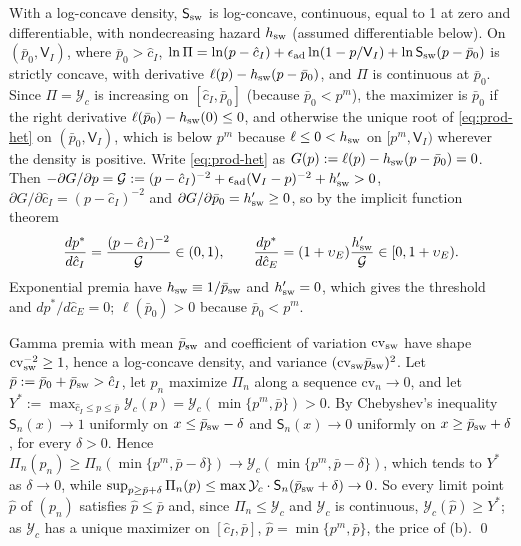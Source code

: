 With a log-concave density, $\mathsf S_{\rm sw}$ is log-concave, continuous, equal to 1 at zero and differentiable, with nondecreasing hazard $h_{\rm sw}$ (assumed differentiable below). On $(\bar p_0,\mathsf V_I)$, where $\bar p_0>\hat c_I$, $\ln\Pi=\ln(p-\hat c_I)+\epsilon_{\rm ad}\ln(1-p/\mathsf V_I)+\ln\mathsf S_{\rm sw}(p-\bar p_0)$ is strictly concave, with derivative $\ell(p)-h_{\rm sw}(p-\bar p_0)$, and $\Pi$ is continuous at $\bar p_0$. Since $\Pi=\mathcal Y_c$ is increasing on $[\hat c_I,\bar p_0]$ (because $\bar p_0<p^m$), the maximizer is $\bar p_0$ if the right derivative $\ell(\bar p_0)-h_{\rm sw}(0)\le 0$, and otherwise the unique root of \eqref{eq:prod-het} on $(\bar p_0,\mathsf V_I)$, which is below $p^m$ because $\ell\le 0<h_{\rm sw}$ on $[p^m,\mathsf V_I)$ wherever the density is positive. Write \eqref{eq:prod-het} as $G(p):=\ell(p)-h_{\rm sw}(p-\bar p_0)=0$. Then $-\partial G/\partial p=\mathcal G:=(p-\hat c_I)^{-2}+\epsilon_{\rm ad}(\mathsf V_I-p)^{-2}+h'_{\rm sw}>0$, $\partial G/\partial\hat c_I=(p-\hat c_I)^{-2}$ and $\partial G/\partial\bar p_0=h'_{\rm sw}\ge 0$, so by the implicit function theorem
\[
\frac{dp^*}{d\hat c_I}=\frac{(p-\hat c_I)^{-2}}{\mathcal G}\in(0,1),\qquad
\frac{dp^*}{d\hat c_E}=(1+\upsilon_E)\frac{h'_{\rm sw}}{\mathcal G}\in[0,1+\upsilon_E).
\]
Exponential premia have $h_{\rm sw}\equiv 1/\bar p_{\rm sw}$ and $h'_{\rm sw}=0$, which gives the threshold and $dp^*/d\hat c_E=0$; $\ell(\bar p_0)>0$ because $\bar p_0<p^m$.

Gamma premia with mean $\bar p_{\rm sw}$ and coefficient of variation $\mathrm{cv}_{\rm sw}$ have shape $\mathrm{cv}_{\rm sw}^{-2}\ge 1$, hence a log-concave density, and variance $(\mathrm{cv}_{\rm sw}\bar p_{\rm sw})^2$. Let $\bar p:=\bar p_0+\bar p_{\rm sw}>\hat c_I$, let $p_n$ maximize $\Pi_n$ along a sequence $\mathrm{cv}_n\to 0$, and let $Y^*:=\max_{\hat c_I\le p\le\bar p}\mathcal Y_c(p)=\mathcal Y_c(\min\{p^m,\bar p\})>0$. By Chebyshev's inequality $\mathsf S_n(x)\to 1$ uniformly on $x\le\bar p_{\rm sw}-\delta$ and $\mathsf S_n(x)\to 0$ uniformly on $x\ge\bar p_{\rm sw}+\delta$, for every $\delta>0$. Hence $\Pi_n(p_n)\ge\Pi_n(\min\{p^m,\bar p-\delta\})\to\mathcal Y_c(\min\{p^m,\bar p-\delta\})$, which tends to $Y^*$ as $\delta\to0$, while $\sup_{p\ge\bar p+\delta}\Pi_n(p)\le\max\mathcal Y_c\cdot\mathsf S_n(\bar p_{\rm sw}+\delta)\to 0$. So every limit point $\hat p$ of $(p_n)$ satisfies $\hat p\le\bar p$ and, since $\Pi_n\le\mathcal Y_c$ and $\mathcal Y_c$ is continuous, $\mathcal Y_c(\hat p)\ge Y^*$; as $\mathcal Y_c$ has a unique maximizer on $[\hat c_I,\bar p]$, $\hat p=\min\{p^m,\bar p\}$, the price of (b). \qed

